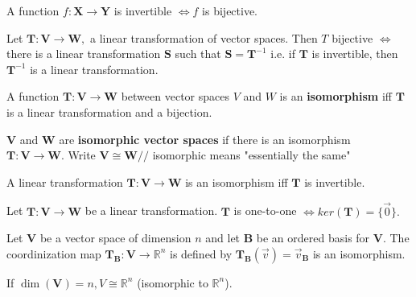 \documentclass{article}
\begin{document}
\begin{theorem}
A function $f: \boldsymbol{X} \rightarrow \boldsymbol{Y}$ is invertible $\iff f$ is bijective. 
\end{theorem}

\begin{corollary}
Let $\boldsymbol{T} : \boldsymbol{V} \rightarrow \boldsymbol{W},$ a linear transformation of vector spaces. Then $T$ bijective $\iff$ there is a linear transformation $\boldsymbol{S}$ such that $\boldsymbol{S} = \boldsymbol{T}^{-1}$ i.e. if $\boldsymbol{T}$ is invertible, then $\boldsymbol{T}^{-1}$ is a linear transformation.
\end{corollary}

\begin{definition}
A function $\boldsymbol{T}: \boldsymbol{V} \rightarrow \boldsymbol{W}$ between vector spaces $V$ and $W$ is an \textbf{isomorphism} iff $\boldsymbol{T}$ is a linear transformation and a bijection.
\end{definition}

\begin{definition}
$\boldsymbol{V}$ and $\boldsymbol{W}$ are \textbf{isomorphic vector spaces} if there is an isomorphism $\boldsymbol{T}: \boldsymbol{V} \rightarrow \boldsymbol{W}.$ Write $\boldsymbol{V} \cong \boldsymbol{W} //$ isomorphic means "essentially the same"
\end{definition}

\begin{corollary}
A linear transformation $\boldsymbol{T}: \boldsymbol{V} \rightarrow \boldsymbol{W}$ is an isomorphism iff $\boldsymbol{T}$ is invertible.
\end{corollary}

\begin{theorem}
Let $\boldsymbol{T}: \boldsymbol{V} \rightarrow \boldsymbol{W}$ be a linear transformation. $\boldsymbol{T}$ is one-to-one $\iff ker(\boldsymbol{T}) = \{\vec{0}\}.$
\end{theorem}

\begin{theorem}
Let $\boldsymbol{V}$ be a vector space of dimension $n$ and let $\boldsymbol{B}$ be an ordered basis for $\boldsymbol{V}.$ The coordinization map $\boldsymbol{T}_{\boldsymbol{B}} : \boldsymbol{V} \rightarrow \mathbb{R}^n$ is defined by $\boldsymbol{T}_{\boldsymbol{B}}(\vec{v}) = \vec{v}_{\boldsymbol{B}}$ is an isomorphism.
\end{theorem}

\begin{corollary}
If $\dim(\boldsymbol{V}) = n, V \cong \mathbb{R}^n$ (isomorphic to $\mathbb{R}^n$).
\end{corollary}
\end{document}
